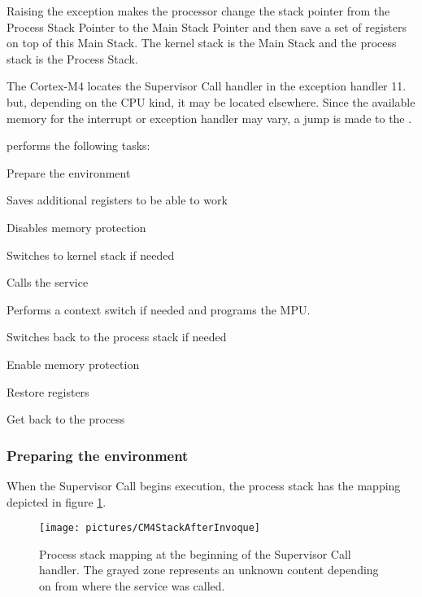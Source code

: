 Raising the  exception makes the processor change the stack pointer from the Process Stack Pointer to the Main Stack Pointer and then save a set of registers on top of this Main Stack.
The kernel stack is the Main Stack and the process stack is the Process Stack.

The Cortex-M4 locates the Supervisor Call handler in the exception handler 11. 
but, depending on the CPU kind, it may be located elsewhere. Since the available memory for the interrupt or exception handler may vary, a jump is made to the .%

 performs the following tasks:
\begin{penum}
\item Prepare the environment
\item Saves additional registers to be able to work
\item Disables memory protection
\item Switches to kernel stack if needed
\item Calls the service
\item Performs a context switch if needed and programs the MPU.
\item Switches back to the process stack if needed
\item Enable memory protection
\item Restore registers
\item Get back to the process
\end{penum}


\subsubsection{Preparing the environment}

When the Supervisor Call begins execution, the process stack has the mapping depicted in figure \ref{fig:CM4StackAfterInvoque}.

\begin{figure}[htbp] %
\begin{minipage}{0.5\textwidth}
    \centering
  \texttt{[image: pictures/CM4StackAfterInvoque]} 
\end{minipage}
\begin{minipage}{0.5\textwidth}
   \caption{Process stack mapping at the beginning of the Supervisor Call handler. The grayed zone represents an unknown content depending on from where the service was called.}\label{fig:CM4StackAfterInvoque}
\end{minipage}
\end{figure}

